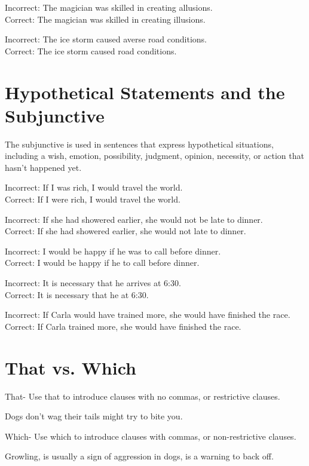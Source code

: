 \documentclass[12pt]{book}
\newcommand{\longline}{\underline{\hspace{2in}} }
\begin{document}
\bigskip
Incorrect:  The magician was skilled in creating allusions.\\
Correct:  The magician was skilled in creating illusions.

\bigskip
Incorrect:  The ice storm caused averse road conditions.\\
Correct:  The ice storm caused \longline road conditions.

\section{Hypothetical Statements and the Subjunctive}
The subjunctive is used in sentences that express hypothetical situations, including a wish, emotion, possibility, judgment, opinion, necessity, or action that hasn't happened yet.

\bigskip
Incorrect:  If I was rich, I would travel the world.\\
Correct:  If I were rich, I would travel the world.

\bigskip
Incorrect: If she had showered earlier, she would not be late to dinner.\\
Correct:  If she had showered earlier, she would not \longline late to dinner.

\bigskip
Incorrect:  I would be happy if he was to call before dinner.\\
Correct:  I would be happy if he \longline to call before dinner.

\bigskip
Incorrect:  It is necessary that he arrives at 6:30.\\
Correct:  It is necessary that he \longline at 6:30.

\bigskip
Incorrect:  If Carla would have trained more, she would have finished the race.\\
Correct:  If Carla \longline trained more, she would have finished the race.

\section{That vs. Which}
That- Use that to introduce clauses with no commas, or restrictive clauses.

\bigskip
Dogs \longline don't wag their tails might try to bite you.

\bigskip
Which- Use which to introduce clauses with commas, or non-restrictive clauses.

\bigskip
Growling, \longline is usually a sign of aggression in dogs, is a warning to back off.
\end{document}
